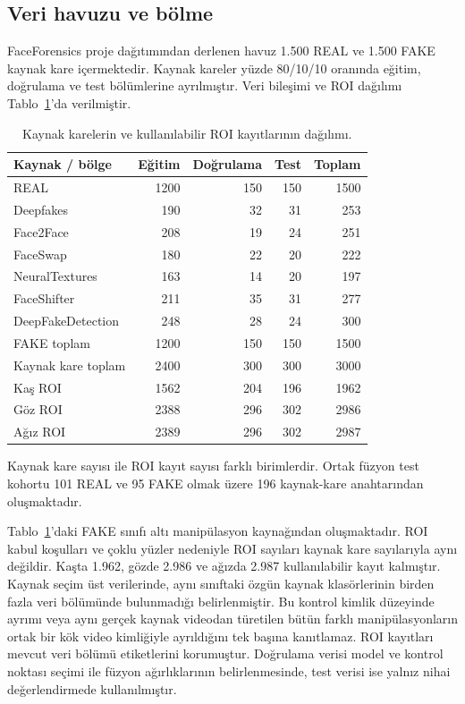 \documentclass[a4paper]{elektr}
\begin{document}
\subsection{Veri havuzu ve bölme}
FaceForensics proje dağıtımından derlenen havuz 1.500 REAL ve 1.500 FAKE kaynak kare içermektedir. Kaynak kareler yüzde 80/10/10 oranında eğitim, doğrulama ve test bölümlerine ayrılmıştır. Veri bileşimi ve ROI dağılımı Tablo~\ref{tab:data}'da verilmiştir.
\begin{table}[!htbp]\centering\begin{minipage}{15.8cm}
\caption{Kaynak karelerin ve kullanılabilir ROI kayıtlarının dağılımı.}\label{tab:data}
\centering \small
\begin{tabular}{lrrrr}\toprule
Kaynak / bölge & Eğitim & Doğrulama & Test & Toplam \\\midrule
REAL & 1200 & 150 & 150 & 1500 \\
Deepfakes & 190 & 32 & 31 & 253 \\
Face2Face & 208 & 19 & 24 & 251 \\
FaceSwap & 180 & 22 & 20 & 222 \\
NeuralTextures & 163 & 14 & 20 & 197 \\
FaceShifter & 211 & 35 & 31 & 277 \\
DeepFakeDetection & 248 & 28 & 24 & 300 \\
FAKE toplam & 1200 & 150 & 150 & 1500 \\
Kaynak kare toplam & 2400 & 300 & 300 & 3000 \\
\midrule Kaş ROI & 1562 & 204 & 196 & 1962 \\
Göz ROI & 2388 & 296 & 302 & 2986 \\
Ağız ROI & 2389 & 296 & 302 & 2987 \\
\bottomrule\end{tabular}
\par\smallskip\begin{minipage}{\linewidth}\small Kaynak kare sayısı ile ROI kayıt sayısı farklı birimlerdir. Ortak füzyon test kohortu 101 REAL ve 95 FAKE olmak üzere 196 kaynak-kare anahtarından oluşmaktadır.\end{minipage}
\end{minipage}\end{table}

Tablo~\ref{tab:data}'daki FAKE sınıfı altı manipülasyon kaynağından oluşmaktadır. ROI kabul koşulları ve çoklu yüzler nedeniyle ROI sayıları kaynak kare sayılarıyla aynı değildir. Kaşta 1.962, gözde 2.986 ve ağızda 2.987 kullanılabilir kayıt kalmıştır. Kaynak seçim üst verilerinde, aynı sınıftaki özgün kaynak klasörlerinin birden fazla veri bölümünde bulunmadığı belirlenmiştir. Bu kontrol kimlik düzeyinde ayrımı veya aynı gerçek kaynak videodan türetilen bütün farklı manipülasyonların ortak bir kök video kimliğiyle ayrıldığını tek başına kanıtlamaz. ROI kayıtları mevcut veri bölümü etiketlerini korumuştur. Doğrulama verisi model ve kontrol noktası seçimi ile füzyon ağırlıklarının belirlenmesinde, test verisi ise yalnız nihai değerlendirmede kullanılmıştır.
\end{document}

